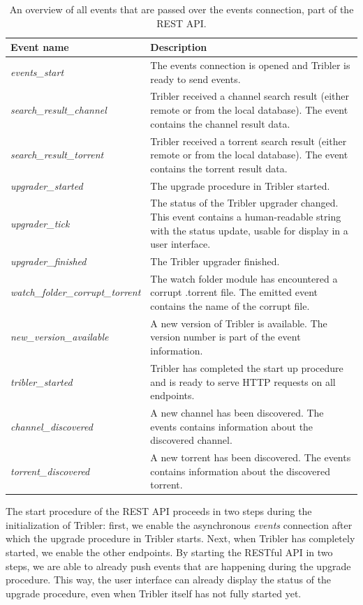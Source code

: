 \begin{table}
	\begin{tabularx}{\textwidth}{|l|X|}
		\hline
		\textbf{Event name} & \textbf{Description} \\ \hline
		\emph{events\_start} & The events connection is opened and Tribler is ready to send events.  \\ \hline
		\emph{search\_result\_channel} & Tribler received a channel search result (either remote or from the local database). The event contains the channel result data. \\ \hline
		\emph{search\_result\_torrent} & Tribler received a torrent search result (either remote or from the local database). The event contains the torrent result data. \\ \hline
		\emph{upgrader\_started} & The upgrade procedure in Tribler started. \\ \hline
		\emph{upgrader\_tick} & The status of the Tribler upgrader changed. This event contains a human-readable string with the status update, usable for display in a user interface. \\ \hline
		\emph{upgrader\_finished} & The Tribler upgrader finished. \\ \hline
		\emph{watch\_folder\_corrupt\_torrent} & The watch folder module has encountered a corrupt .torrent file. The emitted event contains the name of the corrupt file.\\ \hline
		\emph{new\_version\_available} & A new version of Tribler is available. The version number is part of the event information.\\ \hline
		\emph{tribler\_started} & Tribler has completed the start up procedure and is ready to serve HTTP requests on all endpoints.\\ \hline
		\emph{channel\_discovered} & A new channel has been discovered. The events contains information about the discovered channel.\\ \hline
		\emph{torrent\_discovered} & A new torrent has been discovered. The events contains information about the discovered torrent.\\ \hline
	\end{tabularx}
	\caption{An overview of all events that are passed over the events connection, part of the REST API.}
	\label{table:rest-api-events}
\end{table}

The start procedure of the REST API proceeds in two steps during the initialization of Tribler: first, we enable the asynchronous \emph{events} connection after which the upgrade procedure in Tribler starts. Next, when Tribler has completely started, we enable the other endpoints. By starting the RESTful API in two steps, we are able to already push events that are happening during the upgrade procedure. This way, the user interface can already display the status of the upgrade procedure, even when Tribler itself has not fully started yet.


